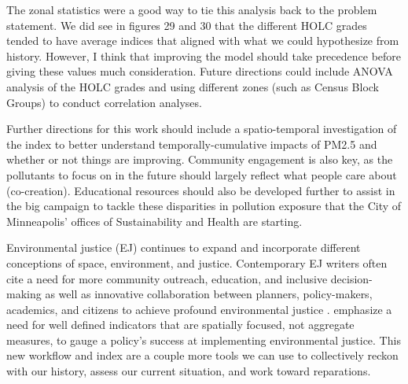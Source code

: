 \documentclass[article,12pt]{article}
\numberwithin{equation}{section}
\begin{document}
	The zonal statistics were a good way to tie this analysis back to the problem statement. We did see in figures 29 and 30 that the different HOLC grades tended to have average indices that aligned with what we could hypothesize from history. However, I think that improving the model should take precedence before giving these values much consideration. Future directions could include ANOVA analysis of the HOLC grades and using different zones (such as Census Block Groups) to conduct correlation analyses.
	
	Further directions for this work should include a spatio-temporal investigation of the index to better understand temporally-cumulative impacts of PM2.5 and whether or not things are improving. Community engagement is also key, as the pollutants to focus on in the future should largely reflect what people care about (co-creation). Educational resources should also be developed further to assist in the big campaign to tackle these disparities in pollution exposure that the City of Minneapolis' offices of Sustainability and Health are starting.
	
	Environmental justice (EJ) continues to expand and incorporate different conceptions of space, environment, and justice. Contemporary EJ writers often cite a need for more community outreach, education, and inclusive decision-making as well as innovative collaboration between planners, policy-makers, academics, and citizens to achieve profound environmental justice \cite{walker2010, corburn2003, pearsall2010}. \textcite{pearsall2010} emphasize a need for well defined indicators that are spatially focused, not aggregate measures, to gauge a policy's success at implementing environmental justice. This new workflow and index are a couple more tools we can use to collectively reckon with our history, assess our current situation, and work toward reparations. 
	
\newpage
\begingroup           %
\setlength\bibitemsep{12pt}  %
\printbibliography
\endgroup
\end{document}

